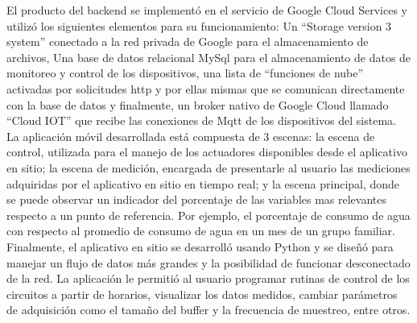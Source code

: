 El producto del backend se implementó en el servicio de Google Cloud Services y utilizó los siguientes elementos para su funcionamiento: Un ``Storage version 3 system'' conectado a la red privada de Google para el almacenamiento de archivos, Una base de datos relacional MySql para el almacenamiento de datos de monitoreo y control de los dispositivos, una lista de ``funciones de nube''  activadas por solicitudes http y por ellas mismas que se comunican directamente con la base de datos y finalmente, un broker nativo de Google Cloud llamado ``Cloud IOT'' que recibe las conexiones de Mqtt de los dispositivos del sistema.
\vspace{0.5cm}\\
La aplicación móvil desarrollada está compuesta de 3 escenas: la escena de control, utilizada para el manejo de los actuadores disponibles desde el aplicativo en sitio; la escena de medición, encargada de presentarle al usuario las mediciones adquiridas por el aplicativo en sitio en tiempo real; y la escena principal, donde se puede observar un indicador del porcentaje de las variables mas relevantes respecto a un punto de referencia. Por ejemplo, el porcentaje de consumo de agua con respecto al promedio de consumo de agua en un mes de un grupo familiar.
\vspace{0.5cm}\\
Finalmente, el aplicativo en sitio se desarrolló usando Python y se diseñó para manejar un flujo de datos más grandes y la posibilidad de funcionar desconectado de la red. La aplicación le permitió al usuario programar rutinas de control de los circuitos a partir de horarios, visualizar los datos medidos, cambiar parámetros de adquisición como el tamaño del buffer y la frecuencia de muestreo, entre otros.

